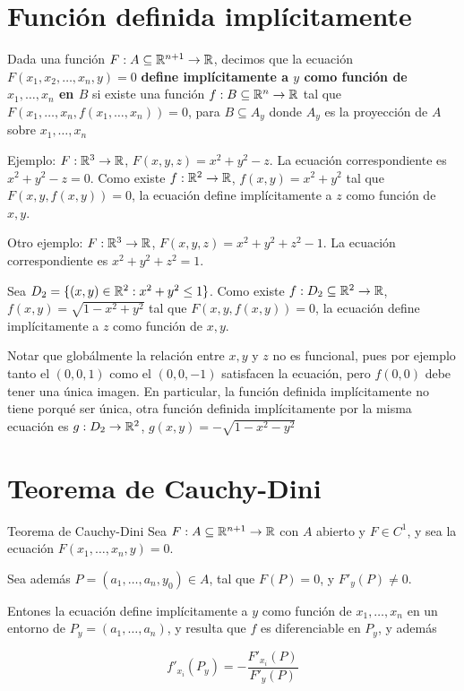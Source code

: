 \section{Función definida implícitamente}

\begin{definition}
Dada una función $F : A \subseteq \mathbb{R}^{n+1} \to \mathbb{R}$, decimos que la ecuación $F(x_1, x_2, \ldots, x_n, y) = 0$ \textbf{define implícitamente a $y$ como función de $x_1, \ldots, x_n$ en $B$} si existe una función $ f : B \subseteq \mathbb{R}^n \to \mathbb{R}$ tal que $F(x_1, \ldots, x_n, f(x_1, \ldots, x_n)) = 0$, para $B \subseteq A_y$ donde $A_y$ es la proyección de $A$ sobre $x_1, \ldots, x_n$
\end{definition}

Ejemplo: $F: \mathbb{R}^3 \to \mathbb{R}$, $F(x,y,z) = x^2 + y^2 - z$.  La ecuación correspondiente es $x^2 + y^2 - z = 0$. Como existe $f : \mathbb{R}^2 \to \mathbb{R}$, $f(x,y) = x^2 + y^2$ tal que $F(x,y,f(x,y)) = 0$, la ecuación define implícitamente a $z$ como función de $x,y$.

Otro ejemplo: $F: \mathbb{R}^3 \to \mathbb{R}$, $F(x,y,z) = x^2 + y^2 + z^2 - 1$.  La ecuación correspondiente es $x^2 + y^2 + z^2 = 1$. 

Sea $D_2 = \{ (x,y) \in \mathbb{R}^2 : x^2 + y^2 \leq 1 \}$. Como existe $f : D_2 \subseteq \mathbb{R}^2 \to \mathbb{R}$, $f(x,y) = \sqrt{1 - x^2 + y^2}$ tal que $F(x,y,f(x,y)) = 0$, la ecuación define implícitamente a $z$ como función de $x,y$.

Notar que globálmente la relación entre $x,y$ y $z$ no es funcional, pues por ejemplo tanto el $(0,0,1)$ como el $(0,0,-1)$ satisfacen la ecuación, pero $f(0,0)$ debe tener una única imagen.  En particular, la función definida implícitamente no tiene porqué ser única, otra función definida implícitamente por la misma ecuación es $g : D_2 \to \mathbb{R}^2$, $g(x,y) = - \sqrt{1 - x^2 - y^2}$

\section{Teorema de Cauchy-Dini}

\begin{theorem}{Teorema de Cauchy-Dini} \label{cauchy_dini} 
Sea $F : A \subseteq \mathbb{R}^{n+1} \to \mathbb{R}$ con $A$ abierto y $F \in C^1$, y sea la ecuación $F(x_1, \ldots, x_n, y) = 0$.

Sea además $P=(a_1, \ldots, a_n, y_0) \in A$, tal que $F(P) = 0$, y $ F'_y(P) \neq 0$.  

Entones la ecuación define implícitamente a $y$ como función de $x_1, \ldots, x_n$ en un entorno de $P_y = (a_1, \ldots, a_n)$, y resulta que $ f $ es diferenciable en $P_y$, y además

$$ f'_{x_i}(P_y) = - \frac{F'_{x_i}(P)}{F'_y(P)} $$
\end{theorem}

